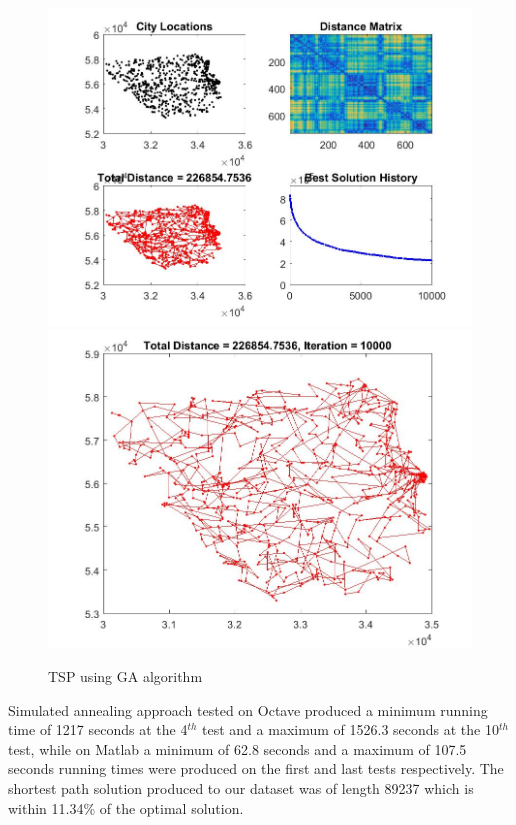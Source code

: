 \documentclass[twocolumn]{article}
\begin{document}
	\begin{figure}[h!]
		\centering
		\includegraphics[scale=0.25]{./GA1.jpg}
		\includegraphics[scale=0.25]{./GA2.jpg}
		\caption{TSP using GA algorithm}
		\label{fig:GAalgorithm}
	\end{figure}
	
	Simulated annealing approach tested on Octave produced a minimum running time of 1217 seconds at the 4$^{th}$ test and a maximum of 1526.3 seconds at the 10$^{th}$ test, while on Matlab a minimum of 62.8 seconds and a maximum of 107.5 seconds running times were produced on the first and last tests respectively. The shortest path solution produced to our dataset was of length 89237 which is within 11.34\% of the optimal solution.
	
\end{document}
